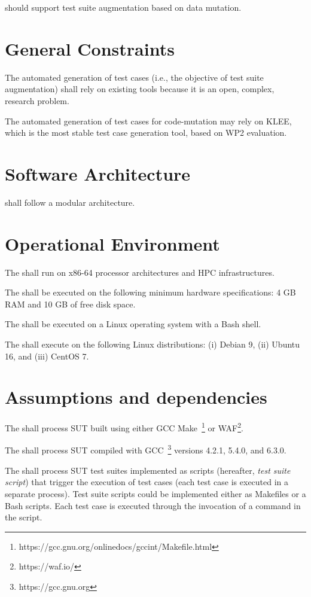 \RQ{} \FAQAS should support test suite augmentation based on data mutation.


\section{General Constraints}

\RQ{} The automated generation of test cases (i.e., the objective of test suite augmentation) shall rely on existing tools because it is an open, complex, research problem.

\RQ{} The automated generation of test cases for code-mutation may rely on KLEE, which is the most stable test case generation tool, based on WP2 evaluation.


\section{Software Architecture}

\RQ{} \FAQAS shall follow a modular architecture.

\section{Operational Environment}

\RQ{} The \FAQAS shall run on x86-64 processor architectures and HPC infrastructures.

\RQ{} The \FAQAS shall be executed on the following minimum hardware specifications: 4 GB RAM and 10 GB of free disk space.

\RQ{} The \FAQAS shall be executed on a Linux operating system with a Bash shell.

\RQ{} The \FAQAS shall execute on the following Linux distributions: (i) Debian 9, (ii) Ubuntu 16, and (iii) CentOS 7.

\section{Assumptions and dependencies}

\RQ{} The \FAQAS shall process SUT built using either GCC Make~\footnote{https://gcc.gnu.org/onlinedocs/gccint/Makefile.html} or WAF\footnote{https://waf.io/}.

\RQ{} The \FAQAS shall process SUT compiled with GCC~\footnote{https://gcc.gnu.org} versions 4.2.1, 5.4.0, and 6.3.0.

\RQ{} The \FAQAS shall process SUT test suites implemented as scripts (hereafter, \emph{test suite script}) that trigger the execution of test cases (each test case is executed in a separate process). Test suite scripts could be implemented either as Makefiles or a Bash scripts. Each test case is executed through the invocation of a command in the script.



